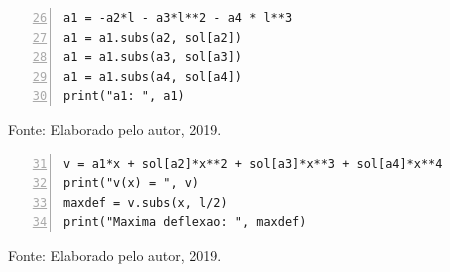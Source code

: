 \documentclass{beamer}
\begin{document}
	
	\begin{frame}[containsverbatim]
		\begin{lstlisting}[style=Python, numbers=left, firstnumber=26, caption={Determinando o coeficiente $a_1$}, captionpos=t]
a1 = -a2*l - a3*l**2 - a4 * l**3
a1 = a1.subs(a2, sol[a2])
a1 = a1.subs(a3, sol[a3])
a1 = a1.subs(a4, sol[a4])
print("a1: ", a1)
		\end{lstlisting}
		\begin{center}
			\footnotesize Fonte: Elaborado pelo autor, 2019.
		\end{center}
		\vspace{-10pt}
		\begin{lstlisting}[style=Python, numbers=left, firstnumber=31, caption={Determinando a função $v$ e a Máxima Deflexão}, captionpos=t]
v = a1*x + sol[a2]*x**2 + sol[a3]*x**3 + sol[a4]*x**4
print("v(x) = ", v)
maxdef = v.subs(x, l/2)
print("Maxima deflexao: ", maxdef)
		\end{lstlisting}
		\begin{center}
			\footnotesize Fonte: Elaborado pelo autor, 2019.
		\end{center}
	\end{frame}
	
\end{document}
